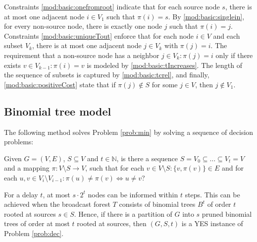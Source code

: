 Constraints \eqref{mod:basic:onefromroot} indicate that for each source node $s$, there is at most one adjacent node $i\in V_1$ such that $\pi(i)=s$.
By \eqref{mod:basic:singlein}, for every non-source node, there is exactly one node $j$ such that $\pi(i)=j$.
Constraints \eqref{mod:basic:uniqueTout} enforce that for each node $i\in V$ and each subset $V_k$, there is at most one adjacent node $j\in V_k$ with $\pi(j)=i$.
The requirement that a non-source node has a neighbor $j\in V_k:\pi(j)=i$ only if there exists $v\in V_{k-1}: \pi(i)=v$ is modeled by \eqref{mod:basic:tIncreases}. 
The length of the sequence of subsets is captured by \eqref{mod:basic:tcrel}, and finally, \eqref{mod:basic:positiveCost} state that if $\pi(j)\not\in S$ for some $j\in V$, then $j\not\in V_1$.
\subsection{Binomial tree model}

The following method solves Problem \ref{prob:min} by solving a sequence of decision problems:
\begin{problem}
\label{prob:dec}
Given $G=(V,E)$, $S\subseteq V$ and $t\in \mathbb{N}$, is there a sequence $S=V_0\subseteq\dots\subseteq V_t=V$ 
and a mapping $\pi:V\setminus S\to V$, such that for each $v\in V\setminus S:\{v,\pi(v)\}\in E$ and for each  $u,v\in V_i\setminus V_{i-1}: \pi(u)\neq \pi(v)\Leftrightarrow u\neq v$?
\end{problem}
For a delay $t$, at most $s\cdot 2^t$ nodes can be informed within $t$ steps. 
This can be achieved when the broadcast forest $T$ consists of binomial trees $B^t$ of order $t$ rooted at sources $s\in S$.
Hence, if there is a partition of $G$ into $s$ pruned binomial trees of order at most $t$ rooted at sources, then $(G,S,t)$ is a YES instance of Problem \ref{prob:dec}.

